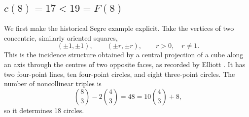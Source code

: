 \documentclass[11pt,a4paper]{article}
\theoremstyle{definition}
\begin{document}
\subsection{\texorpdfstring{$c(8)=17<19=F(8)$}{c(8)=17<19=F(8)}}

We first make the historical Segre example explicit.  Take the vertices of two
concentric, similarly oriented squares,
\[
(\pm1,\pm1),\qquad(\pm r,\pm r),\qquad r>0,\quad r\ne1.
\]
This is the incidence structure obtained by a central projection of a cube along an
axis through the centres of two opposite faces, as recorded by Elliott
\cite[p.~182, discussion following Theorem~2]{elliott-en}.  It has two four-point
lines, ten four-point circles, and eight three-point circles.  The number of
noncollinear triples is
\[
\binom83-2\binom43=48=10\binom43+8,
\]
so it determines 18 circles.
\end{document}
